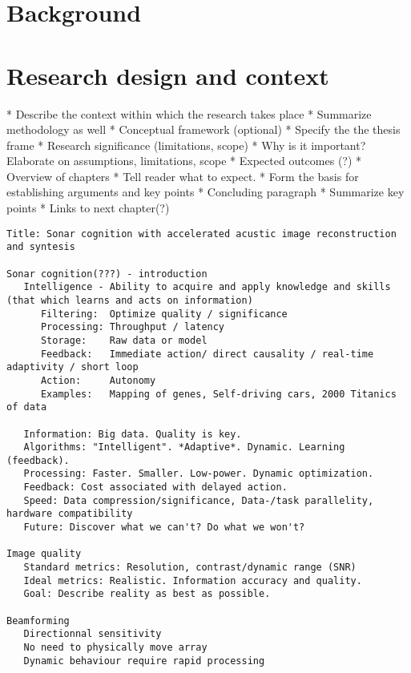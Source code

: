 {\section{Background}
\ifIncludeWritingTips
\begin{markdown}
\end{markdown}
\fi

\section{Research design and context}
\ifIncludeWritingTips
\begin{markdown}
    * Describe the context within which the research takes place
    * Summarize methodology as well
* Conceptual framework (optional)
    * Specify the the thesis frame
* Research significance (limitations, scope)
    * Why is it important? Elaborate on assumptions, limitations, scope
* Expected outcomes (?)
* Overview of chapters
    * Tell reader what to expect.
    * Form the basis for establishing arguments and key points
* Concluding paragraph
    * Summarize key points
    * Links to next chapter(?)
\end{markdown}
\fi

\begin{lstlisting}
Title: Sonar cognition with accelerated acustic image reconstruction and syntesis

Sonar cognition(???) - introduction
   Intelligence - Ability to acquire and apply knowledge and skills (that which learns and acts on information)
      Filtering:  Optimize quality / significance
      Processing: Throughput / latency
      Storage:    Raw data or model
      Feedback:   Immediate action/ direct causality / real-time adaptivity / short loop
      Action:     Autonomy
      Examples:   Mapping of genes, Self-driving cars, 2000 Titanics of data
      
   Information: Big data. Quality is key.
   Algorithms: "Intelligent". *Adaptive*. Dynamic. Learning (feedback).
   Processing: Faster. Smaller. Low-power. Dynamic optimization. 
   Feedback: Cost associated with delayed action. 
   Speed: Data compression/significance, Data-/task parallelity, hardware compatibility  
   Future: Discover what we can't? Do what we won't?
   
Image quality
   Standard metrics: Resolution, contrast/dynamic range (SNR)
   Ideal metrics: Realistic. Information accuracy and quality.
   Goal: Describe reality as best as possible.
   
Beamforming
   Directionnal sensitivity
   No need to physically move array
   Dynamic behaviour require rapid processing


\end{lstlisting}}

